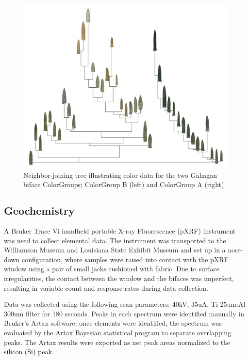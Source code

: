 \documentclass[]{interact}
\theoremstyle{plain}%
\theoremstyle{definition}
\theoremstyle{remark}
\begin{document}
\begin{figure}
\includegraphics[width=1\linewidth]{ms_files/figure-latex/fig4} \caption{Neighbor-joining tree illustrating color data for the two Gahagan biface ColorGroups; ColorGroup B (left) and ColorGroup A (right).}\label{fig:colorspace}
\end{figure}

\hypertarget{geochemistry}{%
\subsection{Geochemistry}\label{geochemistry}}

A Bruker Trace Vi handheld portable X-ray Fluorescence (pXRF) instrument
was used to collect elemental data. The instrument was transported to
the Williamson Museum and Louisiana State Exhibit Museum and set up in a
nose-down configuration, where samples were raised into contact with the
pXRF window using a pair of small jacks cushioned with fabric. Due to
surface irregularities, the contact between the window and the bifaces
was imperfect, resulting in variable count and response rates during
data collection.

Data was collected using the following scan parameters: 40kV, 35uA, Ti
25um:Al 300um filter for 180 seconds. Peaks in each spectrum were
identified manually in Bruker's Artax software; once elements were
identified, the spectrum was evaluated by the Artax Bayesian statistical
program to separate overlapping peaks. The Artax results were exported
as net peak areas normalized to the silicon (Si) peak.
\end{document}
